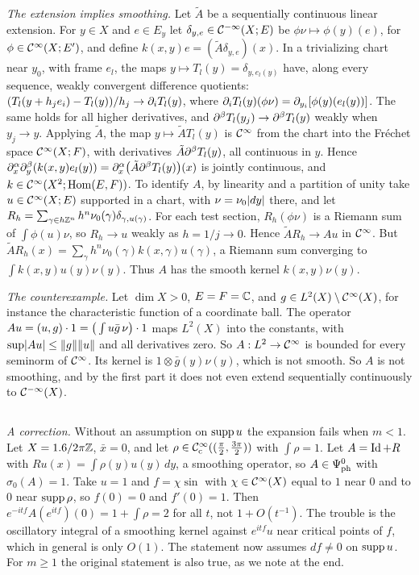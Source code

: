 \emph{The extension implies smoothing.} Let $\tilde A$ be a sequentially continuous linear
extension. For $y\in X$ and $e\in E_y$ let $\delta_{y,e}\in\mathcal{C}^{-\infty}(X;E)$ be
$\phi\nu\mapsto\phi(y)(e)$, for $\phi\in\mathcal{C}^\infty(X;E')$, and define
$k(x,y)e=(\tilde A\delta_{y,e})(x)$. In a trivializing chart near $y_0$, with frame $e_l$, the
maps $y\mapsto T_l(y)=\delta_{y,e_l(y)}$ have, along every sequence, weakly convergent
difference quotients: $(T_l(y+h_je_i)-T_l(y))/h_j\to\partial_iT_l(y)$, where
$\partial_iT_l(y)(\phi\nu)=\partial_{y_i}[\phi(y)(e_l(y))]$. The same holds for all higher derivatives, and
$\partial^\beta T_l(y_j)\to\partial^\beta T_l(y)$ weakly when $y_j\to y$. Applying $\tilde A$, the map
$y\mapsto\tilde AT_l(y)$ is $\mathcal{C}^\infty$ from the chart into the Fr\'echet space $\mathcal{C}^\infty(X;F)$, with
derivatives $\tilde A\partial^\beta T_l(y)$, all continuous in $y$. Hence
$\partial^\alpha_x\partial^\beta_y(k(x,y)e_l(y))=\partial^\alpha_x\big(\tilde A\partial^\beta T_l(y)\big)(x)$ is jointly
continuous, and $k\in\mathcal{C}^\infty(X^2;\operatorname{Hom}(E,F))$. To identify $A$, by linearity and a partition of
unity take $u\in\mathcal{C}^\infty(X;E)$ supported in a chart, with $\nu=\nu_0\lvert dy\rvert$ there, and let
$R_h=\sum_{\gamma\in h\mathbb{Z}^n}h^n\nu_0(\gamma)\delta_{\gamma,u(\gamma)}$. For each test section,
$R_h(\phi\nu)$ is a Riemann sum of $\int\phi(u)\nu$, so $R_h\to u$ weakly as $h=1/j\to0$.
Hence $\tilde AR_h\to Au$ in $\mathcal{C}^\infty$. But
$\tilde AR_h(x)=\sum_\gamma h^n\nu_0(\gamma)k(x,\gamma)u(\gamma)$, a Riemann sum converging to
$\int k(x,y)u(y)\nu(y)$. Thus $A$ has the smooth kernel $k(x,y)\nu(y)$.

\emph{The counterexample.} Let $\dim X>0$, $E=F=\mathbb{C}$, and $g\in L^2(X)\setminus\mathcal{C}^\infty(X)$, for
instance the characteristic function of a coordinate ball. The operator
$Au=( u, g)\cdot1=\big(\int u\bar g\,\nu\big)\cdot1$ maps $L^2(X)$ into the constants, with
$\sup\lvert Au\rvert\le\lVert g\rVert\lVert u\rVert$ and all derivatives zero. So $A:L^2\to\mathcal{C}^\infty$ is bounded for
every seminorm of $\mathcal{C}^\infty$. Its kernel is $1\otimes\bar g(y)\nu(y)$, which is not smooth. So $A$ is
not smoothing, and by the first part it does not even extend sequentially continuously to
$\mathcal{C}^{-\infty}(X)$.

\subsection*{}
\emph{A correction.} Without an assumption on $\operatorname{supp} u$ the expansion fails when $m<1$. Let
$X=1.6/2\pi\mathbb{Z}$, $\bar x=0$, and let $\rho\in\mathcal{C}^\infty_{\mathrm{c}}((\frac\pi2,\frac{3\pi}2))$ with $\int\rho=1$. Let
$A=\operatorname{Id}+R$ with $Ru(x)=\int\rho(y)u(y)\,dy$, a smoothing operator, so $A\in\Psi^{0}_{\mathrm{ph}}$
with $\sigma_0(A)=1$. Take $u=1$ and $f=\chi\sin$ with $\chi\in\mathcal{C}^\infty(X)$ equal to $1$ near $0$
and to $0$ near $\operatorname{supp}\rho$, so $f(0)=0$ and $f'(0)=1$. Then
$e^{-itf}A(e^{itf})(0)=1+\int\rho=2$ for all $t$, not $1+O(t^{-1})$. The trouble is the
oscillatory integral of a smoothing kernel against $e^{itf}u$ near critical points of $f$,
which in general is only $O(1)$. The statement now assumes $df\ne0$ on $\operatorname{supp} u$. For
$m\ge1$ the original statement is also true, as we note at the end.


